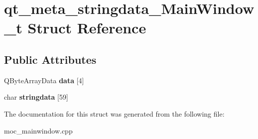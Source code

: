 \hypertarget{structqt__meta__stringdata___main_window__t}{\section{qt\-\_\-meta\-\_\-stringdata\-\_\-\-Main\-Window\-\_\-t Struct Reference}
\label{structqt__meta__stringdata___main_window__t}
}
\subsection*{Public Attributes}
\begin{DoxyCompactItemize}
\item 
\hypertarget{structqt__meta__stringdata___main_window__t_a332d7fa058028f7613b5ba68abb5a7fe}{Q\-Byte\-Array\-Data {\bfseries data} \mbox{[}4\mbox{]}}\label{structqt__meta__stringdata___main_window__t_a332d7fa058028f7613b5ba68abb5a7fe}

\item 
\hypertarget{structqt__meta__stringdata___main_window__t_a1f75f6e6169dcfddb4a6e5701e72456e}{char {\bfseries stringdata} \mbox{[}59\mbox{]}}\label{structqt__meta__stringdata___main_window__t_a1f75f6e6169dcfddb4a6e5701e72456e}

\end{DoxyCompactItemize}


The documentation for this struct was generated from the following file\-:\begin{DoxyCompactItemize}
\item 
moc\-\_\-mainwindow.\-cpp\end{DoxyCompactItemize}
